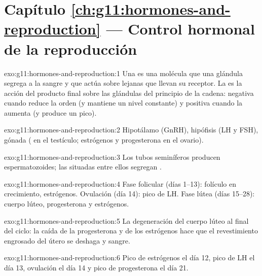 \section*{Capítulo \ref{ch:g11:hormones-and-reproduction} --- Control hormonal de la reproducción}

\begin{solution}{exo:g11:hormones-and-reproduction:1}
Una  es una molécula que una glándula segrega a la sangre y que
actúa sobre  lejanas que llevan su receptor. La
 es la acción del producto final sobre las glándulas
del principio de la cadena: negativa cuando reduce la orden (y mantiene
un nivel constante) y positiva cuando la aumenta (y produce un pico).
\end{solution}

\begin{solution}{exo:g11:hormones-and-reproduction:2}
Hipotálamo (GnRH), hipófisis (LH y FSH), gónada ( en el
testículo; estrógenos y progesterona en el ovario).
\end{solution}

\begin{solution}{exo:g11:hormones-and-reproduction:3}
Los tubos seminíferos producen espermatozoides; las  situadas
entre ellos segregan .
\end{solution}

\begin{solution}{exo:g11:hormones-and-reproduction:4}
Fase folicular (días 1--13): folículo en crecimiento, estrógenos.
Ovulación (día 14): pico de LH. Fase lútea (días 15--28): cuerpo lúteo,
progesterona y estrógenos.
\end{solution}

\begin{solution}{exo:g11:hormones-and-reproduction:5}
La degeneración del cuerpo lúteo al final del ciclo: la caída de la
progesterona y de los estrógenos hace que el revestimiento engrosado
del útero se deshaga y sangre.
\end{solution}

\begin{solution}{exo:g11:hormones-and-reproduction:6}
Pico de estrógenos el día 12, pico de LH el día 13, ovulación el día 14
y pico de progesterona el día 21.
\end{solution}

